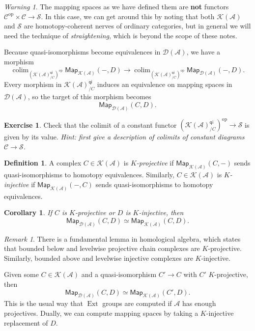 \documentclass[10pt]{amsart}
\newtheorem{cor}[thm]{Corollary}
\theoremstyle{definition}
\newtheorem{defn}[thm]{Definition}
\newtheorem{exer}[thm]{Exercise}
\theoremstyle{remark}
\newtheorem{rmk}[thm]{Remark}
\newtheorem{warn}[thm]{Warning}
\theoremstyle{plain}
\theoremstyle{definition}
\theoremstyle{remark}
\newcommand{\mc}[1]{\mathcal{#1}}
\newcommand{\ms}[1]{\mathsf{#1}}
\newcommand{\1}{\mathbf{1}}
\newcommand{\2}{\mathbf{2}}
\newcommand{\3}{\mathbf{3}}
\DeclareMathOperator{\Ext}{Ext}
\DeclareMathOperator{\op}{op}
\DeclareMathOperator*{\colim}{colim}
\begin{document}
\begin{warn}
    The mapping spaces as we have defined them are \textbf{not} functors $\mc{C}^{\op} \times \mc{C} \to \mc{S}$. In this case, we can get around this by noting that both $\mc{K}(\mc{A})$ and $\mc{S}$ are homotopy-coherent nerves of ordinary categories, but in general we will need the technique of \textit{straightening}, which is beyond the scope of these notes.
\end{warn}

Because quasi-isomorphisms become equivalences in $\mc{D}(\mc{A})$, we have a morphism
\[ \colim_{(\mc{K}(\mc{A})_{/C}^{\ms{qi}})^{\op}} \ms{Map}_{\mc{K}(\mc{A})}(-, D) \to \colim_{(\mc{K}(\mc{A})_{/C}^{\ms{qi}})^{\op}} \ms{Map}_{\mc{D}(\mc{A})}(-, D). \]
Every morphism in $\mc{K}(\mc{A})_{/C}^{\ms{qi}}$ induces an equivalence on mapping spaces in $\mc{D}(\mc{A})$, so the target of this morphism becomes
\[ \ms{Map}_{\mc{D}(\mc{A})}(C, D). \]

\begin{exer}
    Check that the colimit of a constant functor $(\mc{K}(\mc{A})_{/C}^{\ms{qi}})^{\op} \to \mc{S}$ is given by its value. \textit{Hint: first give a description of colimits of constant diagrams $\mc{C} \to \mc{S}$.}
\end{exer}

\begin{defn}
    A complex $C \in \mc{K}(\mc{A})$ is \textit{$K$-projective} if $\ms{Map}_{\mc{K}(\mc{A})}(C, -)$ sends quasi-isomorphisms to homotopy equivalences. Similarly, $C \in \mc{K}(\mc{A})$ is \textit{$K$-injective} if $\ms{Map}_{\mc{K}(\mc{A})}(-, C)$ sends quasi-isomorphisms to homotopy equivalences.
\end{defn}

\begin{cor}
    If $C$ is $K$-projective or $D$ is $K$-injective, then 
    \[ \ms{Map}_{\mc{D}(\mc{A})} (C, D) \simeq \ms{Map}_{\mc{K}(\mc{A})}(C, D). \]
\end{cor}

\begin{rmk}
    There is a fundamental lemma in homological algebra, which states that bounded below and levelwise projective chain complexes are $K$-projective. Similarly, bounded above and levelwise injective complexes are $K$-injective.
\end{rmk}

Given some $C \in \mc{K}(\mc{A})$ and a quasi-isomorphism $C' \to C$ with $C'$ $K$-projective, then
\[ \ms{Map}_{\mc{D}(\mc{A})} (C, D) \simeq \ms{Map}_{\mc{K}(\mc{A})} (C', D). \]
This is the usual way that $\Ext$ groups are computed if $\mc{A}$ has enough projectives. Dually, we can compute mapping spaces by taking a $K$-injective replacement of $D$.
\end{document}
